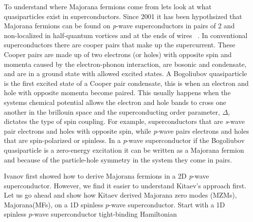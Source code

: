 To understand where Majorana fermions come from lets look at what quasiparticles exist in superconductors.
Since 2001 it has been hypothsized that Majorana fermions can be found on \textit{p}-wave superconductors in pairs of 2 and non-localized in half-quantum vortices and at the ends of wires  ~\cite{ivanovNonAbelianStatisticsHalfQuantum2001, kitaevUnpairedMajoranaFermions2001}.
In conventional superconductors there are cooper pairs that make up the supercurrent.
These Cooper pairs are made up of two electrons (or holes) with opposite spin and momenta caused by the electron-phonon interaction, are bosonic and condensate, and are in a ground state with allowed excited states.
A Bogoliubov quasiparticle is the first excited state of a Cooper pair condensate, this is when an electron and hole with opposite momenta become paired.
This usually happens when the systems chemical potential allows the electron and hole bands to cross one another in the brillouin space and the superconducting order parameter, $\Delta$, dictates the type of spin coupling.
For example, superconductors that are \textit{s}-wave pair electrons and holes with opposite spin, while \textit{p}-wave pairs electrons and holes that are spin-polarized or spinless.
In a \textit{p}-wave superconductor if the Bogoliubov quasiparticle is a zero-energy excitation it can be written as a Majorana fermion and because of the particle-hole symmetry in the system they come in pairs.


Ivanov first showed how to derive Majorana fermions in a 2D \textit{p}-wave superconductor.
However, we find it easier to understand Kitaev's approach first.
Let us go ahead and show how Kitaev derived Majorana zero modes (MZMs), Majorana(MFs), on a 1D spinless $p$-wave superconductor.
Start with a 1D spinless $p$-wave superconductor tight-binding Hamiltonian

